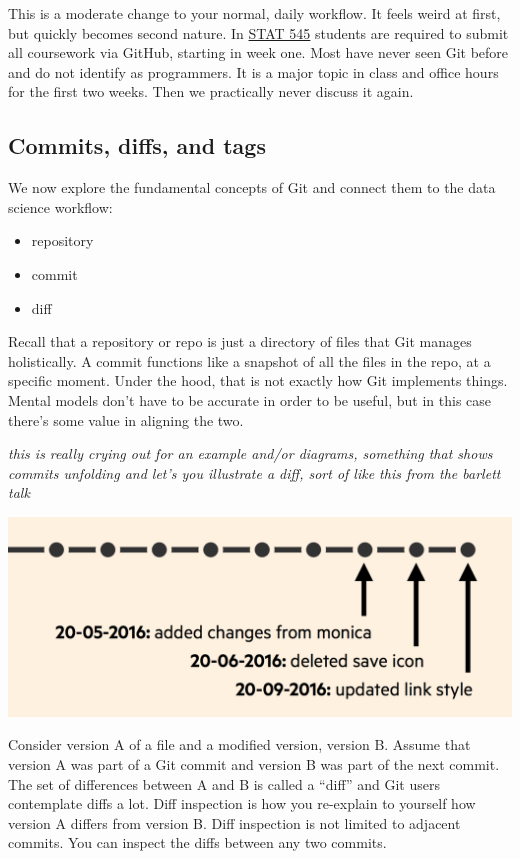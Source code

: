 \documentclass[12pt]{article}
\providecommand{\tightlist}{%
  \setlength{\itemsep}{0pt}\setlength{\parskip}{0pt}}
\begin{document}
This is a moderate change to your normal, daily workflow. It feels weird
at first, but quickly becomes second nature. In
\href{http://stat545.com}{STAT 545} students are required to submit all
coursework via GitHub, starting in week one. Most have never seen Git
before and do not identify as programmers. It is a major topic in class
and office hours for the first two weeks. Then we practically never
discuss it again.

\subsection{Commits, diffs, and tags}\label{commits-diffs-and-tags}

We now explore the fundamental concepts of Git and connect them to the
data science workflow:

\begin{itemize}
\tightlist
\item
  repository
\item
  commit
\item
  diff
\end{itemize}

Recall that a repository or repo is just a directory of files that Git
manages holistically. A commit functions like a snapshot of all the
files in the repo, at a specific moment. Under the hood, that is not
exactly how Git implements things. Mental models don't have to be
accurate in order to be useful, but in this case there's some value in
aligning the two.

\emph{this is really crying out for an example and/or diagrams,
something that shows commits unfolding and let's you illustrate a diff,
sort of like this from the barlett talk}

\includegraphics[width=1\linewidth]{bartlett-commit-history}

Consider version A of a file and a modified version, version B. Assume
that version A was part of a Git commit and version B was part of the
next commit. The set of differences between A and B is called a ``diff''
and Git users contemplate diffs a lot. Diff inspection is how you
re-explain to yourself how version A differs from version B. Diff
inspection is not limited to adjacent commits. You can inspect the diffs
between any two commits.
\end{document}
